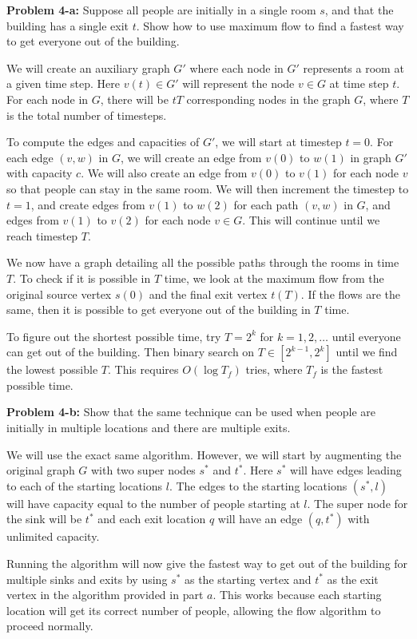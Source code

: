\documentclass[psamsfonts]{amsart}
\newenvironment{sol}{\vspace{0.25cm}{\large \bfseries Solution:}}{\qedsymbol}
\newenvironment{prob}[1]{\begin{framed}{\large \bfseries Problem #1:}}{\end{framed}}
\begin{document}
\begin{prob}{4-a}
Suppose all people are initially in a single room $s$, and that the building has a single exit $t$. Show how to use maximum flow to find a fastest way to get everyone out of the building.
\end{prob}
\begin{sol}
We will create an auxiliary graph $G'$ where each node in $G'$ represents a room at a given time step. Here $v(t) \in G'$ will represent the node $v \in G$ at time step $t$. For each node in $G$, there will be $tT$ corresponding nodes in the graph $G$, where $T$ is the total number of timesteps.

To compute the edges and capacities of $G'$, we will start at timestep $t=0$. For each edge $(v,w)$ in $G$, we will create an edge from $v(0)$ to $w(1)$ in graph $G'$ with capacity $c$. We will also create an edge from $v(0)$ to $v(1)$ for each node $v$ so that people can stay in the same room. We will then increment the timestep to $t=1$, and create edges from $v(1)$ to $w(2)$ for each path $(v,w)$ in $G$, and edges from $v(1)$ to $v(2)$ for each node $v \in G$. This will continue until we reach timestep $T$. 

We now have a graph detailing all the possible paths through the rooms in time $T$. To check if it is possible in $T$ time, we look at the maximum flow from the original source vertex $s(0)$ and the final exit vertex $t(T)$. If the flows are the same, then it is possible to get everyone out of the building in $T$ time. 

To figure out the shortest possible time, try $T=2^{k}$ for $k=1,2,\ldots$ until everyone can get out of the building. Then binary search on $T \in [2^{k-1}, 2^{k}]$ until we find the lowest possible $T$. This requires $O(\log T_{f})$ tries, where $T_f$ is the fastest possible time.
\end{sol}

\begin{prob}{4-b}
Show that the same technique can be used when people are initially in multiple locations and there are multiple exits.
\end{prob}
\begin{sol}
We will use the exact same algorithm. However, we will start by augmenting the original graph $G$ with two super nodes $s^*$ and $t^*$. Here $s^*$ will have edges leading to each of the starting locations $l$. The edges to the starting locations $(s^*, l)$ will have capacity equal to the number of people starting at $l$. The super node for the sink will be $t^*$ and each exit location $q$ will have an edge $(q, t^*)$ with unlimited capacity.

Running the algorithm will now give the fastest way to get out of the building for multiple sinks and exits by using $s^*$ as the starting vertex and $t^*$ as the exit vertex in the algorithm provided in part $a$. This works because each starting location will get its correct number of people, allowing the flow algorithm to proceed normally.
\end{sol}
\end{document}
